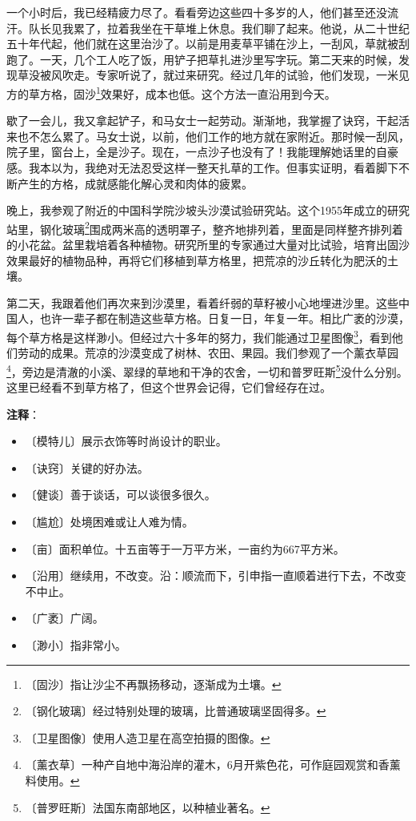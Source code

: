 \documentclass[12pt,UTF-8,openany]{ctexbook}
\begin{document}
\begin{large}
    一个小时后，我已经精疲力尽了。看看旁边这些四十多岁的人，他们甚至还没流汗。队长见我累了，拉着我坐在干草堆上休息。我们聊了起来。他说，从二十世纪五十年代起，他们就在这里治沙了。以前是用麦草平铺在沙上，一刮风，草就被刮跑了。一天，几个工人吃了饭，用铲子把草扎进沙里写字玩。第二天来的时候，发现草没被风吹走。专家听说了，就过来研究。经过几年的试验，他们发现，一米见方的草方格，固沙\footnote{〔固沙〕指让沙尘不再飘扬移动，逐渐成为土壤。}效果好，成本也低。这个方法一直沿用到今天。
    
    歇了一会儿，我又拿起铲子，和马女士一起劳动。渐渐地，我掌握了诀窍，干起活来也不怎么累了。马女士说，以前，他们工作的地方就在家附近。那时候一刮风，院子里，窗台上，全是沙子。现在，一点沙子也没有了！我能理解她话里的自豪感。我本以为，我绝对无法忍受这样一整天扎草的工作。但事实证明，看着脚下不断产生的方格，成就感能化解心灵和肉体的疲累。
    
    晚上，我参观了附近的中国科学院沙坡头沙漠试验研究站。这个1955年成立的研究站里，钢化玻璃\footnote{〔钢化玻璃〕经过特别处理的玻璃，比普通玻璃坚固得多。}围成两米高的透明罩子，整齐地排列着，里面是同样整齐排列着的小花盆。盆里栽培着各种植物。研究所里的专家通过大量对比试验，培育出固沙效果最好的植物品种，再将它们移植到草方格里，把荒凉的沙丘转化为肥沃的土壤。
    
    第二天，我跟着他们再次来到沙漠里，看着纤弱的草籽被小心地埋进沙里。这些中国人，也许一辈子都在制造这些草方格。日复一日，年复一年。相比广袤的沙漠，每个草方格是这样渺小。但经过六十多年的努力，我们能通过卫星图像\footnote{〔卫星图像〕使用人造卫星在高空拍摄的图像。}，看到他们劳动的成果。荒凉的沙漠变成了树林、农田、果园。我们参观了一个薰衣草园\footnote{〔薰衣草〕一种产自地中海沿岸的灌木，6月开紫色花，可作庭园观赏和香薰料使用。}，旁边是清澈的小溪、翠绿的草地和干净的农舍，一切和普罗旺斯\footnote{〔普罗旺斯〕法国东南部地区，以种植业著名。}没什么分别。这里已经看不到草方格了，但这个世界会记得，它们曾经存在过。
    
\end{large}


\newpage

\textbf{注释}：

\vspace{-1em}

\begin{itemize}
    \setlength\itemsep{-0.2em}
    \item 〔模特儿〕展示衣饰等时尚设计的职业。
    \item 〔诀窍〕关键的好办法。
    \item 〔健谈〕善于谈话，可以谈很多很久。
    \item 〔尴尬〕处境困难或让人难为情。
    \item 〔亩〕面积单位。十五亩等于一万平方米，一亩约为667平方米。
    \item 〔沿用〕继续用，不改变。沿：顺流而下，引申指一直顺着进行下去，不改变不中止。
    \item 〔广袤〕广阔。
    \item 〔渺小〕指非常小。
\end{itemize}
\end{document}
